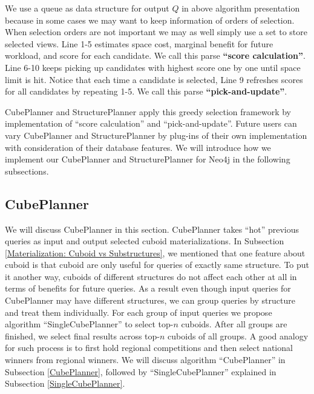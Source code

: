 We use a queue as data structure for output $Q$ in above algorithm presentation because in some cases we may want to keep information of orders of selection. When selection orders are not important we may as well simply use a set to store selected views. Line 1-5 estimates space cost, marginal benefit for future workload, and score for each candidate. We call this parse  \textbf{``score calculation''}. Line 6-10 keeps picking up candidates with highest score one by one until space limit is hit. Notice that each time a candidate is selected, Line 9 refreshes scores for all candidates by repeating 1-5. We call this parse \textbf{``pick-and-update''}.   

CubePlanner and StructurePlanner apply this greedy selection framework by implementation of ``score calculation'' and ``pick-and-update''. Future users can vary CubePlanner and StructurePlanner by plug-ins of their own implementation with consideration of their database features. We will introduce how we implement our CubePlanner and StructurePlanner for Neo4j in the following subsections.

\subsection{CubePlanner}

We will discuss CubePlanner in this section. CubePlanner takes ``hot'' previous queries as input and output selected cuboid materializations. In Subsection \ref{Materialization: Cuboid vs Substructures}, we mentioned that one feature about cuboid is that cuboid are only useful for queries of exactly same structure. To put it another way, cuboids of different structures do not affect each other at all in terms of benefits for future queries. As a result even though input queries for CubePlanner may have different structures, we can group queries by structure and treat them individually. For each group of input queries we propose algorithm ``SingleCubePlanner'' to select top-$n$ cuboids. After all groups are finished, we select final results across top-$n$ cuboids of all groups. A good analogy for such process is to first hold regional competitions and then select national winners from regional winners. We will discuss algorithm ``CubePlanner'' in Subsection \ref{CubePlanner}, followed by ``SingleCubePlanner'' explained in Subsection \ref{SingleCubePlanner}.

